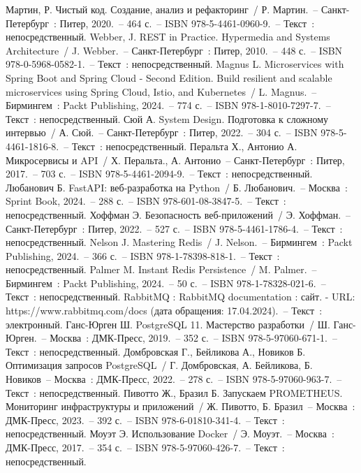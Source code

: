\begin{thebibliography}{9}
		Мартин, Р. Чистый код. Создание, анализ и рефакторинг~/ Р. Мартин.~– Санкт-Петербург~: Питер, 2020.~– 464 с.~– ISBN 978-5-4461-0960-9.~– Текст~: непосредственный.
		Webber, J. REST in Practice. Hypermedia and Systems Architecture~/ J. Webber.~– Санкт-Петербург~: Питер, 2010.~– 448 с.~– ISBN 978-0-5968-0582-1.~– Текст~: непосредственный.
		Magnus L. Microservices with Spring Boot and Spring Cloud - Second Edition. Build resilient and scalable microservices using Spring Cloud, Istio, and Kubernetes~/ L. Magnus.~– Бирмингем~: Packt Publishing, 2024.~– 774 с.~– ISBN 978-1-8010-7297-7.~– Текст~: непосредственный.
		Сюй А. System Design. Подготовка к сложному интервью~/ А. Сюй.~– Санкт-Петербург~: Питер, 2022.~– 304 с.~– ISBN 978-5-4461-1816-8.~– Текст~: непосредственный.
	 Перальта Х., Антонио А. Микросервисы и API~/ Х. Перальта., А. Антонио~– Санкт-Петербург~: Питер, 2017.~– 703 с.~– ISBN 978-5-4461-2094-9.~– Текст~: непосредственный.
	 Любанович Б. FastAPI: веб-разработка на Python~/ Б. Любанович.~– Москва~: Sprint Book, 2024.~– 288 с.~– ISBN 978-601-08-3847-5.~– Текст~: непосредственный.
	 Хоффман Э. Безопасность веб-приложений~/ Э. Хоффман.~– Санкт-Петербург~: Питер, 2022.~– 527 с.~– ISBN 978-5-4461-1786-4.~– Текст~: непосредственный.
	 Nelson J. Mastering Redis~/ J. Nelson.~– Бирмингем~: Packt Publishing, 2024.~– 366 с.~– ISBN 978-1-78398-818-1.~– Текст~: непосредственный.
	 Palmer M. Instant Redis Persistence~/ M. Palmer.~– Бирмингем~: Packt Publishing, 2024.~– 50 с.~– ISBN 978-1-78328-021-6.~– Текст~: непосредственный.
	 RabbitMQ : RabbitMQ  documentation : сайт. - URL: https://www.rabbitmq.com/docs (дата обращения: 17.04.2024).~– Текст~: электронный.
	 Ганс-Юрген Ш. PostgreSQL 11. Мастерство разработки~/ Ш. Ганс-Юрген.~– Москва~: ДМК-Пресс, 2019.~– 352 с.~– ISBN 978-5-97060-671-1.~– Текст~: непосредственный.
	 Домбровская Г., Бейликова А., Новиков Б. Оптимизация запросов PostgreSQL~/ Г. Домбровская, А. Бейликова, Б. Новиков~– Москва~: ДМК-Пресс, 2022.~– 278 с.~– ISBN 978-5-97060-963-7.~– Текст~: непосредственный.
	 Пивотто Ж., Бразил Б. Запускаем PROMETHEUS. Мониторинг инфраструктуры и приложений~/ Ж. Пивотто, Б. Бразил~– Москва~: ДМК-Пресс, 2023.~– 392 с.~– ISBN 978-6-01810-341-4.~– Текст~: непосредственный.
	 Моуэт Э. Использование Docker~/ Э. Моуэт.~– Москва~: ДМК-Пресс, 2017.~– 354 с.~– ISBN 978-5-97060-426-7.~– Текст~: непосредственный.

\end{thebibliography}
